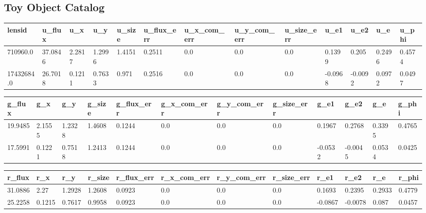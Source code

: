 \documentclass[\docopts]{\docclass}
\begin{document}
\subsection{Toy Object Catalog}
\label{subsec:toyobject}

\begin{table}[!h]
\centering

\begin{tabular}{|l|l|l|l|l|l|l|l|l|l|l|l|l|}
\hline
lensid     & u\_flux & u\_x   & u\_y   & u\_size & u\_flux\_err & u\_x\_com\_err & u\_y\_com\_err & u\_size\_err & u\_e1   & u\_e2   & u\_e   & u\_phi \\ \hline
710960.0   & 37.0846 & 2.2817 & 1.2996 & 1.4151  & 0.2511       & 0.0            & 0.0            & 0.0          & 0.1399  & 0.205   & 0.2496 & 0.4574 \\ \hline
17432684.0 & 26.7018 & 0.1211 & 0.7633 & 0.971   & 0.2516       & 0.0            & 0.0            & 0.0          & -0.0968 & -0.0092 & 0.0972 & 0.0497 \\ \hline
\end{tabular}

\begin{tabular}{|l|l|l|l|l|l|l|l|l|l|ll|}
\hline
g\_flux & g\_x   & g\_y   & g\_size & g\_flux\_err & g\_x\_com\_err & g\_y\_com\_err & g\_size\_err & g\_e1   & g\_e2   & g\_e   & g\_phi	\\ \hline
19.9485 & 2.1555 & 1.2328 & 1.4608  & 0.1244       & 0.0            & 0.0            & 0.0          & 0.1967  & 0.2768  & 0.3395 & 0.4765 \\ \hline
17.5991 & 0.1221 & 0.7518 & 1.2413  & 0.1244       & 0.0            & 0.0            & 0.0          & -0.0532 & -0.0045 & 0.0534	& 0.0425	\\ \hline
\end{tabular}


\begin{tabular}{|l|l|l|l|l|l|l|l|l|l|l|l|}
\hline
r\_flux & r\_x   & r\_y   & r\_size & r\_flux\_err & r\_x\_com\_err & r\_y\_com\_err & r\_size\_err & r\_e1   & r\_e2   & r\_e   & r\_phi \\ \hline
31.0886 & 2.27   & 1.2928 & 1.2608  & 0.0923       & 0.0            & 0.0            & 0.0          & 0.1693  & 0.2395  & 0.2933 & 0.4779 \\
25.2258 & 0.1215 & 0.7617 & 0.9958  & 0.0923       & 0.0            & 0.0            & 0.0          & -0.0867 & -0.0078 & 0.087  & 0.0457 \\ \hline
\end{tabular}


\end{table}
\end{document}
